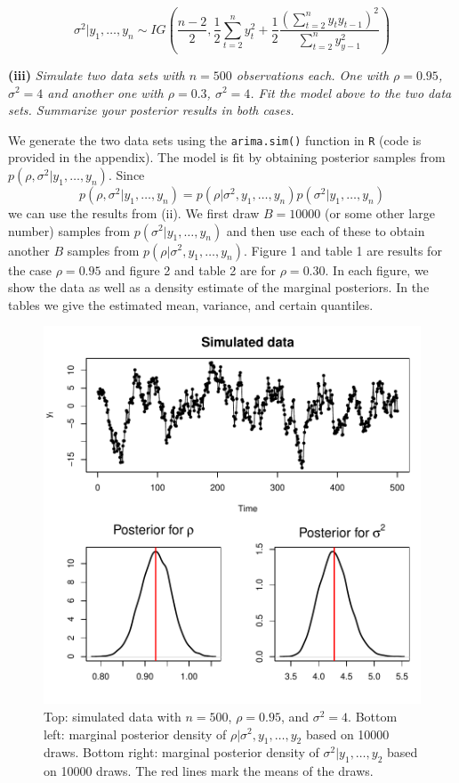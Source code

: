 \documentclass[12pt]{article}
\begin{document}
\[ \sigma^2|y_1,\ldots,y_n \sim IG\left(\frac{n-2}{2}, \frac{1}{2}\sum_{t=2}^ny_t^2 +\frac{1}{2}\frac{(\sum_{t=2}^ny_t y_{t-1})^2}{\sum_{t=2}^ny_{y-1}^2}\right) \]

\bigskip
\noindent \textbf{(iii)} \emph{Simulate two data sets with $n=500$ observations each. One with $\rho=0.95$, $\sigma^2=4$ and another one with $\rho=0.3$, $\sigma^2=4$. Fit the model above to the two data sets. Summarize your posterior results in both cases.}
\bigskip

\noindent We generate the two data sets using the \texttt{arima.sim()} function in \texttt{R} (code is provided in the appendix). The model is fit by obtaining posterior samples from $p(\rho,\sigma^2|y_1,\ldots,y_n)$. Since
\[ p(\rho,\sigma^2|y_1,\ldots,y_n) = p(\rho|\sigma^2,y_1,\ldots,y_n)p(\sigma^2|y_1,\ldots,y_n) \]
we can use the results from (ii). We first draw $B=10000$ (or some other large number) samples from $p(\sigma^2|y_1,\ldots,y_n)$ and then use each of these to obtain another $B$ samples from $p(\rho|\sigma^2,y_1,\ldots,y_n)$. Figure 1 and table 1 are results for the case $\rho=0.95$ and figure 2 and table 2 are for $\rho=0.30$. In each figure, we show the data as well as a density estimate of the marginal posteriors. In the tables we give the estimated mean, variance, and certain quantiles.

\begin{figure}[H]
\begin{center}
\includegraphics[scale=0.75]{figs/fig_1.pdf}
\end{center}
\caption{Top: simulated data with $n=500$, $\rho=0.95$, and $\sigma^2=4$. Bottom left: marginal posterior density of $\rho|\sigma^2,y_1,\ldots,y_2$ based on 10000 draws. Bottom right: marginal posterior density of $\sigma^2|y_1,\ldots,y_2$ based on 10000 draws. The red lines mark the means of the draws.}
\end{figure}
\bigskip
\end{document}
